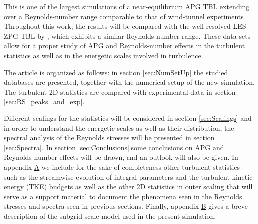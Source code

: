 This is one of the largest simulations of a near-equilibrium APG TBL extending over a Reynolds-number range comparable to that of wind-tunnel experiments \citep{MTL_expSANMIGUEL}. 
Throughout this work, the results will be compared with the well-resolved LES ZPG TBL by \cite{EAmorZPG}, which exhibits a similar Reynolds-number range. These data-sets allow for a proper study of APG and Reynolds-number effects in the turbulent statistics as well as in the energetic scales involved in turbulence.

The article is organized as follows: in section \ref{sec:NumSetUp} the studied databases are presented, together with the numerical setup of the new simulation. 
The turbulent 2D statistics are compared with experimental data in section \ref{sec:RS_peaks_and_exp}.

Different scalings for the statistics will be considered in section \ref{sec:Scalings} and in order to understand the energetic scales as well as their distribution, the spectral analysis of the Reynolds stresses will be presented in section \ref{sec:Spectra}. 
In section \ref{sec:Conclusions} some conclusions on APG and Reynolds-number effects will be drawn, and an outlook will also be given. In appendix \hyperlink{AppA}{A} we include for the sake of completeness other turbulent statistics such as the streamwise evolution of integral parameters and the turbulent kinetic energy (TKE) budgets as well as the other 2D statistics in outer scaling that will serve as a support material to document the phenomena seen in the Reynolds stresses and spectra seen in previous sections.
Finally, appendix \hyperlink{AppB}{B} gives a breve description of the subgrid-scale model used in the present simulation.

